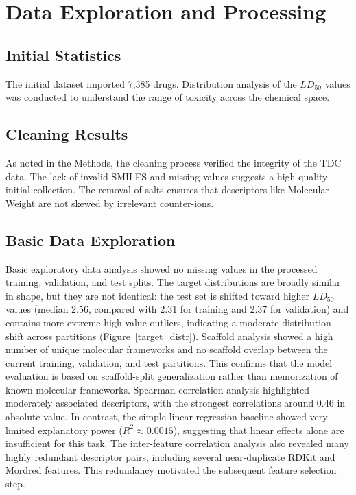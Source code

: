 \documentclass[10pt,a4paper,twocolumn]{article}
\begin{document}
\section{Data Exploration and Processing}

\subsection{Initial Statistics}

The initial dataset imported 7,385 drugs. Distribution analysis of the $LD_{50}$
values was conducted to understand the range of toxicity across the chemical
space.

\subsection{Cleaning Results}

As noted in the Methods, the cleaning process verified the integrity of the TDC
data. The lack of invalid SMILES and missing values suggests a high-quality
initial collection. The removal of salts ensures that descriptors like Molecular
Weight are not skewed by irrelevant counter-ions.

\subsection{Basic Data Exploration}
Basic exploratory data analysis showed no missing values in the processed training, validation, and test splits. The target distributions are broadly similar in shape, but they are not identical: the test set is shifted toward higher $LD_{50}$ values (median 2.56, compared with 2.31 for training and 2.37 for validation) and contains more extreme high-value outliers, indicating a moderate distribution shift across partitions (Figure~\ref{target_distr}). 
Scaffold analysis showed a high number of unique molecular frameworks and no scaffold overlap between the current training, validation, and test partitions. This confirms that the model evaluation is based on scaffold-split generalization rather than memorization of known molecular frameworks. 
Spearman correlation analysis highlighted moderately associated descriptors, with the strongest correlations around 0.46 in absolute value. In contrast, the simple linear regression baseline showed very limited explanatory power ($R^2 \approx 0.0015$), suggesting that linear effects alone are insufficient for this task.
The inter-feature correlation analysis also revealed many highly redundant descriptor pairs, including several near-duplicate RDKit and Mordred features. This redundancy motivated the subsequent feature selection step.
\end{document}
